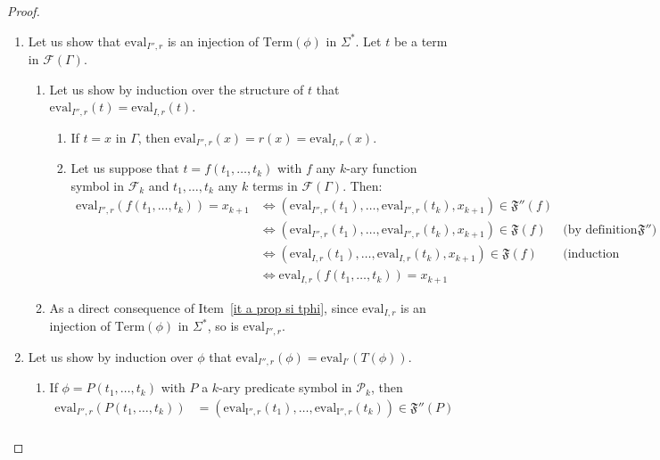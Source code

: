 \documentclass[a4paper]{llncs}
\begin{document}
  \begin{proof} 
  \begin{enumerate}
    \item Let us show that $\mathrm{eval}_{I'',r}$ is an injection of $\mathrm{Term}(\phi)$ in $\Sigma^*$. Let $t$ be a term in $\mathcal{F}(\Gamma)$. 
    \begin{enumerate}
      \item\label{it a prop si tphi} Let us show by induction over the structure of $t$ that $\mathrm{eval}_{I'',r}(t)=\mathrm{eval}_{I,r}(t)$.
      \begin{enumerate}
        \item If $t=x$ in $\Gamma$, then $\mathrm{eval}_{I'',r}(x)=r(x)=\mathrm{eval}_{I,r}(x)$.
        \item Let us suppose that $t=f(t_1,\ldots,t_k)$ with $f$ any $k$-ary function symbol in $\mathcal{F}_k$ and $t_1,\ldots,t_k$ any $k$ terms in $\mathcal{F}(\Gamma)$. Then:
        \begin{align*}
        \mathrm{eval}_{I'',r}(f(t_1,\ldots,t_k))= x_{k+1} & \Leftrightarrow (\mathrm{eval}_{I'',r}(t_1),\ldots,\mathrm{eval}_{I'',r}(t_k),x_{k+1})\in \mathfrak{F}''(f)\\
        & \Leftrightarrow (\mathrm{eval}_{I'',r}(t_1),\ldots,\mathrm{eval}_{I'',r}(t_k),x_{k+1})\in \mathfrak{F}(f) & \text{(by definition of $\mathfrak{F}''$)}\\ 
        & \Leftrightarrow (\mathrm{eval}_{I,r}(t_1),\ldots,\mathrm{eval}_{I,r}(t_k),x_{k+1})\in \mathfrak{F}(f) &\text{(induction hypothesis)}\\
        & \Leftrightarrow \mathrm{eval}_{I,r}(f(t_1,\ldots,t_k))= x_{k+1}
        \end{align*}  
      \end{enumerate}  
      \item As a direct consequence of Item~\ref{it a prop si tphi}, since $\mathrm{eval}_{I,r}$ is an injection of $\mathrm{Term}(\phi)$ in $\Sigma^*$, so is $\mathrm{eval}_{I'',r}$.
    \end{enumerate}
    \item  Let us show by induction over $\phi$ that $\mathrm{eval}_{I'',r}(\phi)=\mathrm{eval}_{I'}(T(\phi))$.
    \begin{enumerate}
      \item If $\phi=P(t_1,\ldots,t_k)$ with $P$ a $k$-ary predicate symbol in $\mathcal{P}_k$, then 
      \begin{align*}
        \mathrm{eval}_{I'',r}(P(t_1,\ldots,t_k))&=(\mathrm{eval}_{\mathrm{I}'',r}(t_1),\ldots,\mathrm{eval}_{\mathrm{I}'',r}(t_k))\in \mathfrak{F}''(P)\\

\end{align*}
\end{enumerate}
\end{enumerate}
\end{proof}
\end{document}
